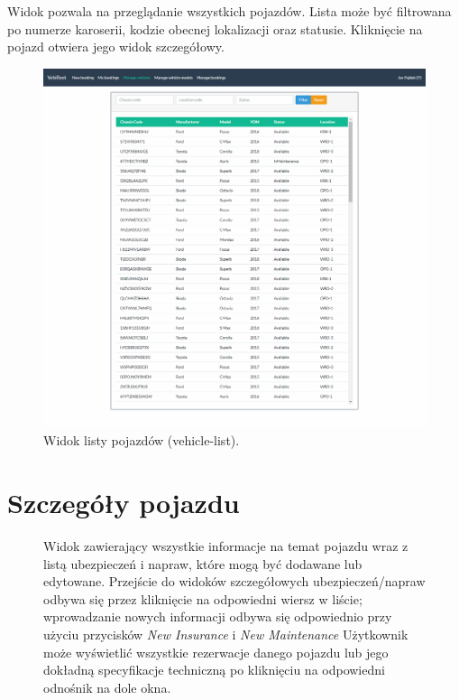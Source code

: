 \documentclass[eng,printmode,openany]{mgr}
\begin{document}
\begin{appendices}
		Widok pozwala na przeglądanie wszystkich pojazdów. Lista może być filtrowana po numerze karoserii, kodzie obecnej lokalizacji oraz statusie. Kliknięcie na pojazd otwiera jego widok szczegółowy.
		\begin{figure}[H]
			\centering
			\includegraphics[width=\textwidth]{images/views/vehicle-list.png}
			\caption{Widok listy pojazdów (vehicle-list).}
		\end{figure}
		
		\newpage
		\section{Szczegóły pojazdu}	
		\begin{figure}[H]

			Widok zawierający wszystkie informacje na temat pojazdu wraz z listą ubezpieczeń i napraw, które mogą być dodawane lub edytowane. Przejście do widoków szczegółowych ubezpieczeń/napraw odbywa się przez kliknięcie na odpowiedni wiersz w liście; wprowadzanie nowych informacji odbywa się odpowiednio przy użyciu przycisków \textit{New Insurance} i \textit{New Maintenance} Użytkownik może wyświetlić wszystkie rezerwacje danego pojazdu lub jego dokładną specyfikacje techniczną po kliknięciu na odpowiedni odnośnik na dole okna.
			

\end{figure}
\end{appendices}
\end{document}

